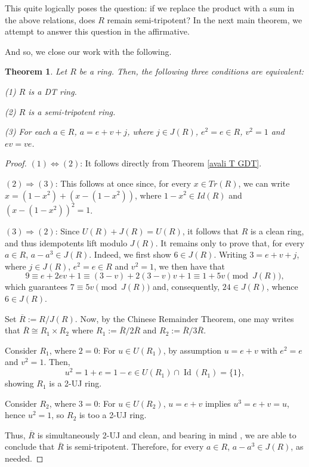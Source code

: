 \documentclass[12pt]{amsart}
\newtheorem{theorem}{Theorem}[section]
\theoremstyle{definition}
\begin{document}
\medskip

This quite logically poses the question: if we replace the product with a sum in the above relations, does $R$ remain semi-tripotent? In the next main theorem, we attempt to answer this question in the affirmative. 

\medskip

And so, we close our work with the following.

\begin{theorem}\label{maj4}
Let $R$ be a ring. Then, the following three conditions are equivalent:

(1) $R$ is a DT ring.

(2) $R$ is a semi-tripotent ring.

(3) For each $a \in R$, $a = e+v+j$, where $j \in J(R)$, $e^2 = e \in R$, $v^2 = 1$ and $ev = ve$.
\end{theorem}

\begin{proof}
$(1) \Leftrightarrow (2)$: It follows directly from Theorem \ref{avali T GDT}.

$(2) \Rightarrow  (3)$: This follows at once since, for every $x \in Tr(R)$, we can write $x = (1-x^2) + (x-(1-x^2))$, where $1-x^2 \in Id(R)$ and $(x-(1-x^2))^2=1$.

$(3) \Rightarrow (2)$: Since $U(R)+J(R) = U(R)$, it follows that $R$ is a clean ring, and thus idempotents lift modulo $J(R)$. It remains only to prove that, for every $a \in R$, $a-a^3 \in J(R)$. Indeed, we first show $6 \in J(R)$. Writing $3 = e+v+j$, where $j \in J(R)$, $e^2 = e \in R$ and $v^2 = 1$, we then have that
\[
9 \equiv e+2ev+1 \equiv (3-v)+2(3-v)v+1 \equiv 1+5v \pmod{J(R)},
\]
which guarantees $7 \equiv 5v \pmod{J(R)}$ and, consequently, $24 \in J(R)$, whence $6 \in J(R)$.

Set $\overline{R} := R/J(R)$. Now, by the Chinese Remainder Theorem, one may writes that $\overline{R} \cong R_1 \times R_2$ where $R_1 := \overline{R}/2\overline{R}$ and $R_2 := \overline{R}/3\overline{R}$.

Consider $R_1$, where $2=0$: For $u \in U(R_1)$, by assumption $u = e+v$ with $e^2=e$ and $v^2=1$. Then, $$u^2 = 1+e=1-e \in U(R_1) \cap \operatorname{Id}(R_1) = \{1\},$$ showing $R_1$ is a 2-UJ ring.

Consider $R_2$, where $3=0$: For $u \in U(R_2)$, $u = e+v$ implies $u^3 = e+v = u$, hence $u^2=1$, so $R_2$ is too a 2-UJ ring.

Thus, $\overline{R}$ is simultaneously 2-UJ and clean, and bearing in mind \cite[Theorem 3.3]{cui}, we are able to conclude that $\overline{R}$ is semi-tripotent. Therefore, for every $a \in R$, $a-a^3 \in J(R)$, as needed.
\end{proof}
\end{document}
